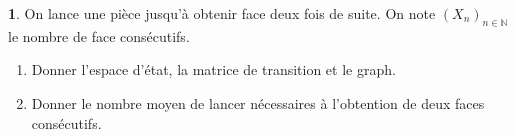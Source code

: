 \documentclass[8pt,notheorems]{beamer}
\def \E{\mathbb E}
\def \N{\mathbb N}
\theoremstyle{definition}
\theoremstyle{example}
\newtheorem{example}{\translate{Exemple}}
\theoremstyle{mystyle}
\theoremstyle{plain}
\begin{document}
\begin{frame}[allowframebreaks]
\begin{example}
On lance une pièce jusqu'à obtenir face deux fois de suite. On note $(X_n)_{n\in \N}$ le nombre de face consécutifs.
\begin{enumerate}
\item Donner l'espace d'état, la matrice de transition et le graph.
\item Donner le nombre moyen de lancer nécessaires à l'obtention de deux faces consécutifs.
\end{enumerate}
\end{example}
\end{frame}
\end{document}
